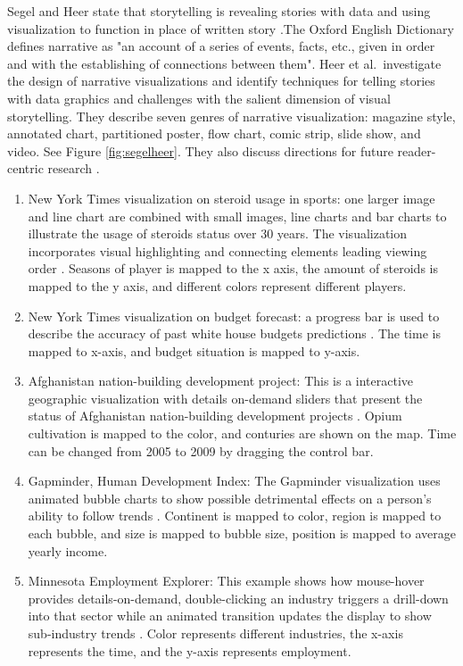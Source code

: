 \documentclass{egpubl}
\begin{document}
 Segel and Heer state that storytelling  is revealing stories with data and using visualization to function in place of written story \cite{segal}.The Oxford English Dictionary defines narrative as "an account of a series of events, facts, etc., given in order and with the establishing of connections between them". 
Heer et al.\ investigate the design of narrative visualizations and identify techniques for telling stories with data graphics and challenges with the salient dimension of visual storytelling. They describe seven genres of narrative visualization: magazine style, annotated chart, partitioned poster, flow chart, comic strip, slide show, and video. See Figure \ref{fig:segelheer}. They also discuss directions for future reader-centric research \cite{Heer1}.
\begin{enumerate}
\item New York Times visualization on steroid usage in sports: one larger image and line chart are combined with small images, line charts and bar charts to illustrate the usage of steroids status over 30 years. The visualization incorporates visual highlighting and connecting elements leading viewing order \cite{steroids}. Seasons of player is mapped to the x axis, the amount of steroids is mapped to the y axis, and different colors represent different players.
\item New York Times visualization on budget forecast: a progress bar is used to describe the accuracy of past white house budgets predictions \cite{budget}. The time is mapped to x-axis, and budget situation is mapped to y-axis.
\item Afghanistan nation-building development project: This is a interactive geographic visualization with details on-demand sliders that present the status of Afghanistan nation-building development projects \cite{afghanistan}. Opium cultivation is mapped to the color, and conturies are shown on the map. Time can be changed from 2005 to 2009 by dragging the control bar.
\item Gapminder, Human Development Index: The Gapminder visualization uses animated bubble charts to show possible detrimental effects on a person's ability to follow trends \cite{gapminder2}. Continent is mapped to color, region is mapped to each bubble, and size is mapped to bubble size, position is mapped to average yearly income.
\item Minnesota Employment Explorer: This example shows how mouse-hover provides details-on-demand, double-clicking an industry triggers a drill-down into that sector while an animated transition updates the display to show sub-industry trends \cite{heer2}. Color represents different industries, the x-axis represents the time, and the y-axis represents employment.
\end{enumerate}
\end{document}
